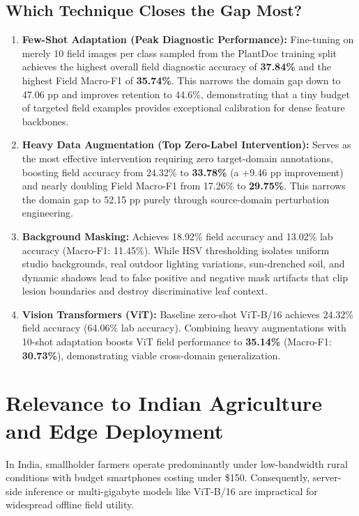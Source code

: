 \documentclass[twoside,a4paper,11pt]{article}
\begin{document}
\subsection{Which Technique Closes the Gap Most?}
\begin{enumerate}
    \item \textbf{Few-Shot Adaptation (Peak Diagnostic Performance):} Fine-tuning on merely 10 field images per class sampled from the PlantDoc training split achieves the highest overall field diagnostic accuracy of \textbf{37.84\%} and the highest Field Macro-F1 of \textbf{35.74\%}. This narrows the domain gap down to 47.06 pp and improves retention to 44.6\%, demonstrating that a tiny budget of targeted field examples provides exceptional calibration for dense feature backbones.
    \item \textbf{Heavy Data Augmentation (Top Zero-Label Intervention):} Serves as the most effective intervention requiring zero target-domain annotations, boosting field accuracy from 24.32\% to \textbf{33.78\%} (a +9.46 pp improvement) and nearly doubling Field Macro-F1 from 17.26\% to \textbf{29.75\%}. This narrows the domain gap to 52.15 pp purely through source-domain perturbation engineering.
    \item \textbf{Background Masking:} Achieves 18.92\% field accuracy and 13.02\% lab accuracy (Macro-F1: 11.45\%). While HSV thresholding isolates uniform studio backgrounds, real outdoor lighting variations, sun-drenched soil, and dynamic shadows lead to false positive and negative mask artifacts that clip lesion boundaries and destroy discriminative leaf context.
    \item \textbf{Vision Transformers (ViT):} Baseline zero-shot ViT-B/16 achieves 24.32\% field accuracy (64.06\% lab accuracy). Combining heavy augmentations with 10-shot adaptation boosts ViT field performance to \textbf{35.14\%} (Macro-F1: \textbf{30.73\%}), demonstrating viable cross-domain generalization.
\end{enumerate}

\section{Relevance to Indian Agriculture and Edge Deployment}

In India, smallholder farmers operate predominantly under low-bandwidth rural conditions with budget smartphones costing under \$150. Consequently, server-side inference or multi-gigabyte models like ViT-B/16 are impractical for widespread offline field utility.
\end{document}
